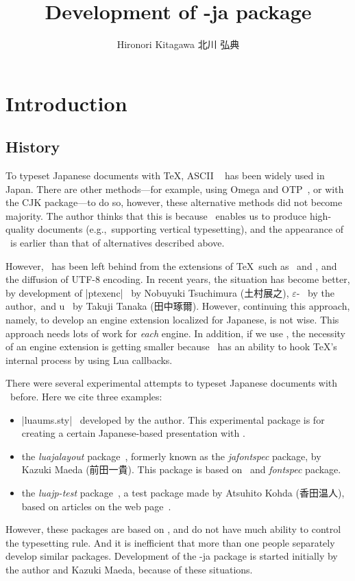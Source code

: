 \documentclass{ajt}
\title{Development of \LuaTeX-ja package}
\author{Hironori Kitagawa {\normalsize 北川 弘典}}
\begin{document}
\maketitle

\section{Introduction}
\subsection{History}
To typeset Japanese documents with \TeX, ASCII \pTeX~\cite{ptex} has
been widely used in Japan.  There are other methods---for example, using
Omega and OTP~\cite{omega}, or with the CJK package---to do so, however,
these alternative methods did not become majority.  The author thinks
that this is because \pTeX\ enables us to produce high-quality documents
(e.g.,~supporting vertical typesetting), and the appearance of \pTeX\ is
earlier than that of alternatives described above.

However, \pTeX\ has been left behind from the extensions of \TeX\ such
as \eTeX\ and \pdfTeX, and the diffusion of UTF-8 encoding.  In recent
years, the situation has become better, by development of
|ptexenc|~\cite{ptexenc} by Nobuyuki Tsuchimura (\hbox{土村展之}),
$\varepsilon$-\pTeX~\cite{eptex} by the author,~and u\pTeX~\cite{uptex}
by Takuji Tanaka (田中琢爾). However, continuing this approach, namely,
to develop an engine extension localized for Japanese, is not wise. This
approach needs lots of work for \emph{each} engine. In addition, if we
use \LuaTeX, the necessity of an engine extension is getting smaller
because \LuaTeX\ has an ability to hook \TeX's internal process by using
Lua callbacks.


There were several experimental attempts to typeset
Japanese documents with \LuaTeX\ before. Here we cite three examples:
\begin{itemize}
\item |luaums.sty|~\cite{luaums} developed by the author. This
      experimental package is for creating a certain Japanese-based presentation
      with \LuaTeX.
\item the \emph{luajalayout} package~\cite{luajalayout}, formerly known as the
      \emph{jafontspec} package, by Kazuki Maeda (前田一貴). This package is based on
      \LaTeXe\ and \emph{fontspec} package.
\item the \emph{luajp-test} package~\cite{luajp-test}, a test package made by
      Atsuhito Kohda (香田温人), based on articles on the web page~\cite{joylua}.
\end{itemize}
However, these packages are based on \LaTeXe, and do not have much
ability to control the typesetting rule. And it is inefficient that more
than one people separately develop similar packages.  Development of the
\LuaTeX-ja package is started initially by the author and Kazuki Maeda, because of
these situations.
\end{document}
